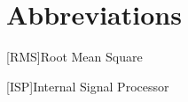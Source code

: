 \chapter*{Abbreviations}
\begin{acronym}
	[RMS]{Root Mean Square}
\end{acronym}

\begin{acronym}
	[ISP]{Internal Signal Processor}
\end{acronym}






